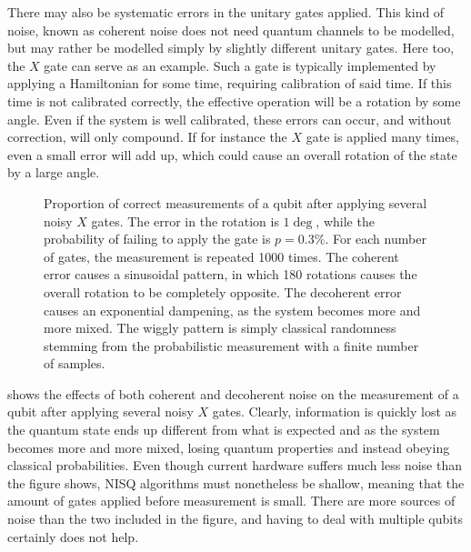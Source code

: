 There may also be systematic errors in the unitary gates applied.
This kind of noise, known as coherent noise does not need quantum channels to be modelled, but may rather be modelled simply by slightly different unitary gates.
Here too, the $X$ gate can serve as an example.
Such a gate is typically implemented by applying a Hamiltonian for some time, requiring calibration of said time.
If this time is not calibrated correctly, the effective operation will be a rotation by some angle.
Even if the system is well calibrated, these errors can occur, and without correction, will only compound.
If for instance the $X$ gate is applied many times, even a small error will add up, which could cause an overall rotation of the state by a large angle.

\begin{figure}
    \centering
    \caption{
        Proportion of correct measurements of a qubit after applying several noisy $X$ gates.
        The error in the rotation is $1\deg$, while the probability of failing to apply the gate is $p=0.3\%$.
        For each number of gates, the measurement is repeated 1000 times.
        The coherent error causes a sinusoidal pattern, in which 180 rotations causes the overall rotation to be completely opposite.
        The decoherent error causes an exponential dampening, as the system becomes more and more mixed.
        The wiggly pattern is simply classical randomness stemming from the probabilistic measurement with a finite number of samples.
    }
    \label{fig:noise_graph}
\end{figure}

 shows the effects of both coherent and decoherent noise on the measurement of a qubit after applying several noisy $X$ gates.
Clearly, information is quickly lost as the quantum state ends up different from what is expected and as the system becomes more and more mixed, losing quantum properties and instead obeying classical probabilities.
Even though current hardware suffers much less noise than the figure shows, NISQ algorithms must nonetheless be shallow, meaning that the amount of gates applied before measurement is small.
There are more sources of noise than the two included in the figure, and having to deal with multiple qubits certainly does not help.

